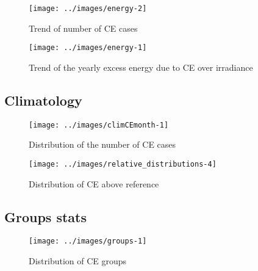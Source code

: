 \documentclass[
]{article}
\begin{document}
\begin{figure}[h!]

{\centering \texttt{[image: ../images/energy-2]} 

}

\caption{Trend of number of CE cases}\label{fig:unnamed-chunk-2}
\end{figure}

\begin{figure}[h!]

{\centering \texttt{[image: ../images/energy-1]} 

}

\caption{Trend of the yearly excess energy due to CE over irradiance}\label{fig:unnamed-chunk-3}
\end{figure}

\FloatBarrier

\hypertarget{climatology}{%
\subsection{Climatology}\label{climatology}}

\begin{figure}[h!]

{\centering \texttt{[image: ../images/climCEmonth-1]} 

}

\caption{Distribution of the number of CE cases}\label{fig:unnamed-chunk-4}
\end{figure}

\begin{figure}[h!]

{\centering \texttt{[image: ../images/relative\_distributions-4]} 

}

\caption{Distribution of CE above reference}\label{fig:unnamed-chunk-5}
\end{figure}

\FloatBarrier

\hypertarget{groups-stats}{%
\subsection{Groups stats}\label{groups-stats}}

\begin{figure}[h!]

{\centering \texttt{[image: ../images/groups-1]} 

}

\caption{Distribution of CE groups}\label{fig:unnamed-chunk-6}
\end{figure}
\end{document}

